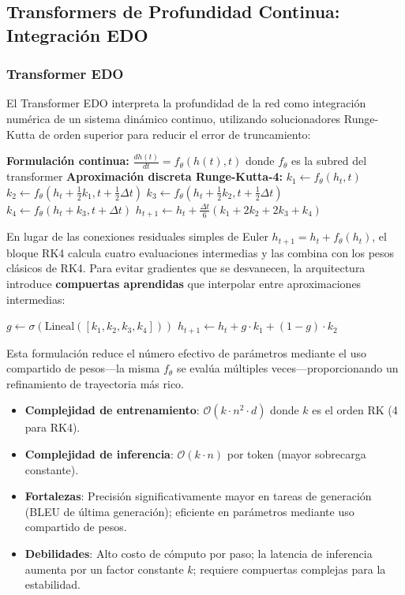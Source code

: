 \documentclass[11pt,a4paper]{article}
\begin{document}
\subsection{Transformers de Profundidad Continua: Integración EDO}

\subsubsection{Transformer EDO}
El Transformer EDO \citep{zhang_continuous_2021} interpreta la profundidad de la red como integración numérica de un sistema dinámico continuo, utilizando solucionadores Runge-Kutta de orden superior para reducir el error de truncamiento:

\begin{algorithmic}[1]
\State \textbf{Formulación continua:} $\frac{dh(t)}{dt} = f_\theta(h(t), t)$ donde $f_\theta$ es la subred del transformer
\State \textbf{Aproximación discreta Runge-Kutta-4:}
\State $k_1 \gets f_\theta(h_t, t)$
\State $k_2 \gets f_\theta(h_t + \tfrac{1}{2}k_1, t + \tfrac{1}{2}\Delta t)$
\State $k_3 \gets f_\theta(h_t + \tfrac{1}{2}k_2, t + \tfrac{1}{2}\Delta t)$
\State $k_4 \gets f_\theta(h_t + k_3, t + \Delta t)$
\State $h_{t+1} \gets h_t + \frac{\Delta t}{6}(k_1 + 2k_2 + 2k_3 + k_4)$ 
\end{algorithmic}

En lugar de las conexiones residuales simples de Euler $h_{t+1} = h_t + f_\theta(h_t)$, el bloque RK4 calcula cuatro evaluaciones intermedias y las combina con los pesos clásicos de RK4. Para evitar gradientes que se desvanecen, la arquitectura introduce \textbf{compuertas aprendidas} que interpolar entre aproximaciones intermedias:

\begin{algorithmic}[1]
\State $g \gets \sigma(\text{Lineal}([k_1, k_2, k_3, k_4]))$ 
\State $h_{t+1} \gets h_t + g \cdot k_1 + (1-g) \cdot k_2$ 
\end{algorithmic}

Esta formulación reduce el número efectivo de parámetros mediante el uso compartido de pesos---la misma $f_\theta$ se evalúa múltiples veces---proporcionando un refinamiento de trayectoria más rico.

\begin{itemize}[leftmargin=*]
    \item \textbf{Complejidad de entrenamiento}: $\mathcal{O}(k \cdot n^2 \cdot d)$ donde $k$ es el orden RK (4 para RK4).
    \item \textbf{Complejidad de inferencia}: $\mathcal{O}(k \cdot n)$ por token (mayor sobrecarga constante).
    \item \textbf{Fortalezas}: Precisión significativamente mayor en tareas de generación (BLEU de última generación); eficiente en parámetros mediante uso compartido de pesos.
    \item \textbf{Debilidades}: Alto costo de cómputo por paso; la latencia de inferencia aumenta por un factor constante $k$; requiere compuertas complejas para la estabilidad.
\end{itemize}
\end{document}
